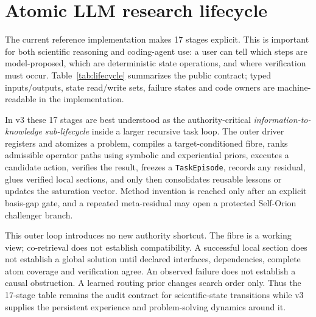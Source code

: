 \section{Atomic LLM research lifecycle}
The current reference implementation makes 17 stages explicit. This is important for both scientific reasoning and coding-agent use: a user can tell which steps are model-proposed, which are deterministic state operations, and where verification must occur. Table~\ref{tab:lifecycle} summarizes the public contract; typed inputs/outputs, state read/write sets, failure states and code owners are machine-readable in the implementation.


In v3 these 17 stages are best understood as the authority-critical \emph{information-to-knowledge sub-lifecycle} inside a larger recursive task loop. The outer driver registers and atomizes a problem, compiles a target-conditioned fibre, ranks admissible operator paths using symbolic and experiential priors, executes a candidate action, verifies the result, freezes a \texttt{TaskEpisode}, records any residual, glues verified local sections, and only then consolidates reusable lessons or updates the saturation vector. Method invention is reached only after an explicit basis-gap gate, and a repeated meta-residual may open a protected Self-Orion challenger branch.

This outer loop introduces no new authority shortcut. The fibre is a working view; co-retrieval does not establish compatibility. A successful local section does not establish a global solution until declared interfaces, dependencies, complete atom coverage and verification agree. An observed failure does not establish a causal obstruction. A learned routing prior changes search order only. Thus the 17-stage table remains the audit contract for scientific-state transitions while v3 supplies the persistent experience and problem-solving dynamics around it.

